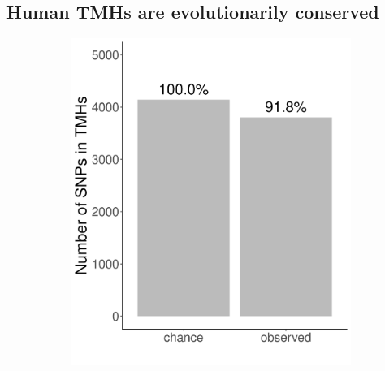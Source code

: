 \subsection{Human TMHs are evolutionarily conserved}

\begin{figure}
  \centering
  \begin{subfigure}[t]{0.45\textwidth}
    \centering
    \caption{}
    \includegraphics[width=\linewidth]{ncbi_peregrine_results/fig_conservation.png}
    \label{fig:conservation}
  \end{subfigure}
  \hfill
  \begin{subfigure}[t]{0.45\textwidth}
    \centering
    \caption{}

\end{subfigure}
\end{figure}
